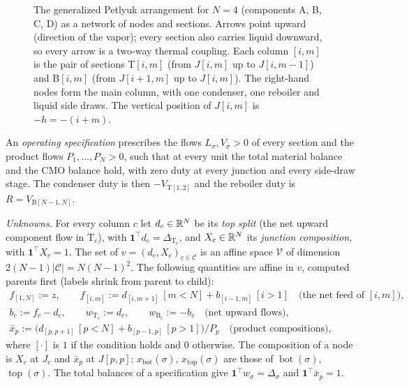 \documentclass[11pt,a4paper]{report}
\newcommand{\cC}{\mathcal C}
\newcommand{\cV}{\mathcal V}
\newcommand{\one}{\mathbf 1}
\newcommand{\Ts}{\mathrm T}
\newcommand{\Bs}{\mathrm B}
\newcommand{\xb}{x_{\mathrm{bot}}}
\newcommand{\xt}{x_{\mathrm{top}}}
\newcommand{\bott}{\operatorname{bot}}
\newcommand{\topp}{\operatorname{top}}
\begin{document}
\begin{figure}[t]
\caption{The generalized Petlyuk arrangement for \(N=4\) (components A, B, C, D) as a network of nodes and sections.
Arrows point upward (direction of the vapor); every section also carries liquid downward, so every arrow is a two-way
thermal coupling. Each column \([i,m]\) is the pair of sections \(\Ts[i,m]\) (from \(J[i,m]\) up to \(J[i,m-1]\)) and
\(\Bs[i,m]\) (from \(J[i+1,m]\) up to \(J[i,m]\)). The right-hand nodes form the main column, with one condenser, one
reboiler and liquid side draws. The vertical position of \(J[i,m]\) is \(-h=-(i+m)\).}\label{fig:petlyuk}
\end{figure}

\begin{definition}\label{def:spec}
An \emph{operating specification} prescribes the flows \(L_\sigma,V_\sigma>0\) of every section and the product flows
\(P_1,\dots,P_N>0\), such that at every unit the total material balance and the CMO balance hold, with zero duty at every
junction and every side-draw stage. The condenser duty is then \(-V_{\Ts[1,2]}\) and the reboiler duty is
\(R=V_{\Bs[N-1,N]}\).
\end{definition}

\emph{Unknowns.} For every column \(c\) let \(d_c\in\mathbb{R}^N\) be its \emph{top split} (the net upward component flow in
\(\Ts_c\)), with \(\one^\top d_c=\Delta_{\Ts_c}\), and \(X_c\in\mathbb{R}^N\) its \emph{junction composition}, with \(\one^\top X_c=1\). The
set of \(v=(d_c,X_c)_{c\in\cC}\) is an affine space \(\cV\) of dimension \(2(N-1)|\cC|=N(N-1)^2\). The following quantities are
affine in \(v\), computed parents first (labels shrink from parent to child):
\begin{gather*}
f_{[1,N]}:=z,\qquad f_{[i,m]}:=d_{[i,m+1]}\,[m<N]+b_{[i-1,m]}\,[i>1]\quad\text{(the net feed of \([i,m]\))},\\
b_c:=f_c-d_c,\qquad w_{\Ts_c}:=d_c,\qquad w_{\Bs_c}:=-b_c\quad\text{(net upward flows)},\\
\bar x_p:=\bigl(d_{[p,p+1]}\,[p<N]+b_{[p-1,p]}\,[p>1]\bigr)/P_p\quad\text{(product compositions)},
\end{gather*}
where \([\cdot]\) is \(1\) if the condition holds and \(0\) otherwise.
The composition of a node is \(X_c\) at \(J_c\) and \(\bar x_p\) at \(J[p,p]\); \(\xb(\sigma)\), \(\xt(\sigma)\) are those of
\(\bott(\sigma)\), \(\topp(\sigma)\). The total balances of a specification give \(\one^\top w_\sigma=\Delta_\sigma\) and
\(\one^\top\bar x_p=1\).
\end{document}
